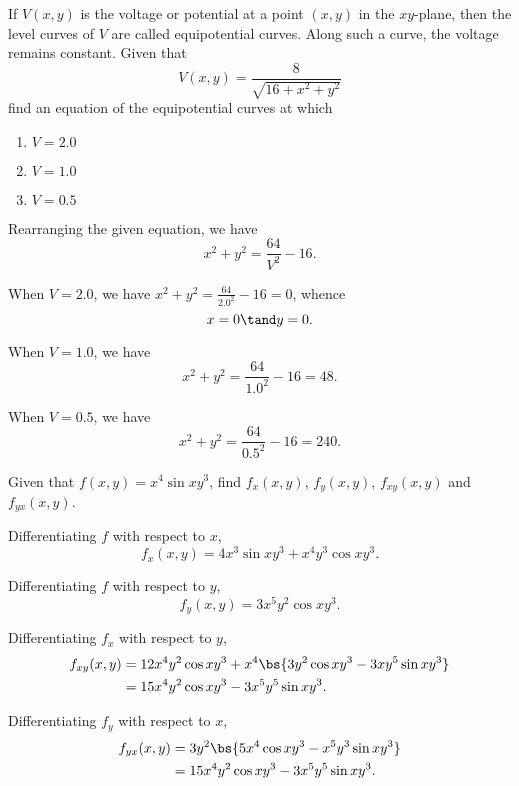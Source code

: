 \begin{problem}
    If $V(x, y)$ is the voltage or potential at a point $(x, y)$ in the $xy$-plane, then the level curves of $V$ are called equipotential curves. Along such a curve, the voltage remains constant. Given that \[V(x, y) = \frac{8}{\sqrt{16 + x^2 + y^2}}\] find an equation of the equipotential curves at which
    \begin{enumerate}
        \item $V = 2.0$
        \item $V = 1.0$
        \item $V = 0.5$
    \end{enumerate}
\end{problem}
\begin{solution}
    Rearranging the given equation, we have \[x^2 + y^2 = \frac{64}{V^2} - 16.\]

    \begin{ppart}
        When $V = 2.0$, we have $x^2 + y^2 = \frac{64}{2.0^2} - 16 = 0$, whence \[x = 0 \tand y = 0.\]
    \end{ppart}
    \begin{ppart}
        When $V = 1.0$, we have \[x^2 + y^2 = \frac{64}{1.0^2} - 16 = 48.\]
    \end{ppart}
    \begin{ppart}
        When $V = 0.5$, we have \[x^2 + y^2 = \frac{64}{0.5^2} - 16 = 240.\]
    \end{ppart}
\end{solution}

\begin{problem}
    Given that $f(x, y) = x^4 \sin{xy^3}$, find $f_x(x, y)$, $f_y(x, y)$, $f_{xy}(x, y)$ and $f_{yx}(x, y)$.
\end{problem}
\begin{solution}
    Differentiating $f$ with respect to $x$, \[f_x(x, y) = 4x^3 \sin{xy^3} + x^4 y^3 \cos{xy^3}.\]

    Differentiating $f$ with respect to $y$, \[f_y(x, y) = 3x^5y^2\cos{xy^3}.\]

    Differentiating $f_x$ with respect to $y$, 
    \begin{align*}
        f_{xy}(x, y) &= 12x^4y^2\cos{xy^3} + x^4\bs{3y^2\cos{xy^3} - 3xy^5\sin{xy^3}}\\
        &= 15x^4y^2\cos{xy^3} - 3x^5y^5\sin{xy^3}.
    \end{align*}

    Differentiating $f_y$ with respect to $x$,
    \begin{align*}
        f_{yx}(x, y) &= 3y^2\bs{5x^4 \cos{xy^3} - x^5y^3\sin{xy^3}}\\
        &= 15x^4y^2 \cos{xy^3} - 3x^5y^5 \sin{xy^3}.
    \end{align*}
\end{solution}

